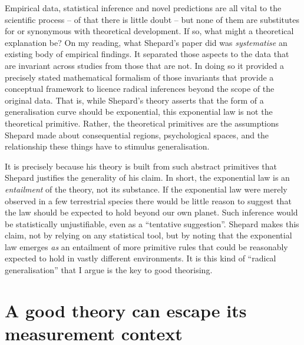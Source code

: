 \documentclass[english,doc]{apa6}
\begin{document}
Empirical data, statistical inference and novel predictions are all vital to the scientific process -- of that there is little doubt -- but none of them are substitutes for or synonymous with theoretical development. If so, what might a theoretical explanation be? On my reading, what Shepard's paper did was \emph{systematise} an existing body of empirical findings. It separated those aspects to the data that are invariant across studies from those that are not. In doing so it provided a precisely stated mathematical formalism of those invariants that provide a conceptual framework to licence radical inferences beyond the scope of the original data. That is, while Shepard's theory asserts that the form of a generalisation curve should be exponential, this exponential law is not the theoretical primitive. Rather, the theoretical primitives are the assumptions Shepard made about consequential regions, psychological spaces, and the relationship these things have to stimulus generalisation.

It is precisely because his theory is built from such abstract primitives that Shepard justifies the generality of his claim. In short, the exponential law is an \emph{entailment} of the theory, not its substance. If the exponential law were merely observed in a few terrestrial species there would be little reason to suggest that the law should be expected to hold beyond our own planet. Such inference would be statistically unjustifiable, even as a \enquote{tentative suggestion}. Shepard makes this claim, not by relying on any statistical tool, but by noting that the exponential law emerges \emph{as} an entailment of more primitive rules that could be reasonably expected to hold in vastly different environments. It is this kind of \enquote{radical generalisation} that I argue is the key to good theorising.

\hypertarget{a-good-theory-can-escape-its-measurement-context}{%
\section{A good theory can escape its measurement context}\label{a-good-theory-can-escape-its-measurement-context}}
\end{document}

